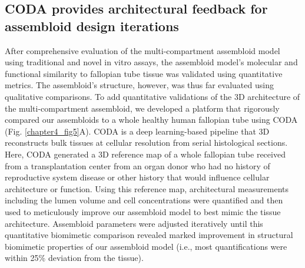 \begin{refsection}
    
    \subsection{CODA provides architectural feedback for assembloid design iterations}
    After comprehensive evaluation of the multi-compartment assembloid model using traditional and novel in vitro assays, the assembloid model’s molecular and functional similarity to fallopian tube tissue was validated using quantitative metrics. The assembloid’s structure, however, was thus far evaluated using qualitative comparisons. To add quantitative validations of the 3D architecture of the multi-compartment assembloid, we developed a platform that rigorously compared our assembloids to a whole healthy human fallopian tube using CODA (Fig. \ref{chapter4_fig5}A). CODA is a deep learning-based pipeline that 3D reconstructs bulk tissues at cellular resolution from serial histological sections\cite{kiemen2022a,Braxton20243D}. Here, CODA generated a 3D reference map of a whole fallopian tube received from a transplantation center from an organ donor who had no history of reproductive system disease or other history that would influence cellular architecture or function. Using this reference map, architectural measurements including the lumen volume and cell concentrations were quantified and then used to meticulously improve our assembloid model to best mimic the tissue architecture. Assembloid parameters were adjusted iteratively until this quantitative biomimetic comparison revealed marked improvement in structural biomimetic properties of our assembloid model (i.e., most quantifications were within 25\% deviation from the tissue).

\end{refsection}
